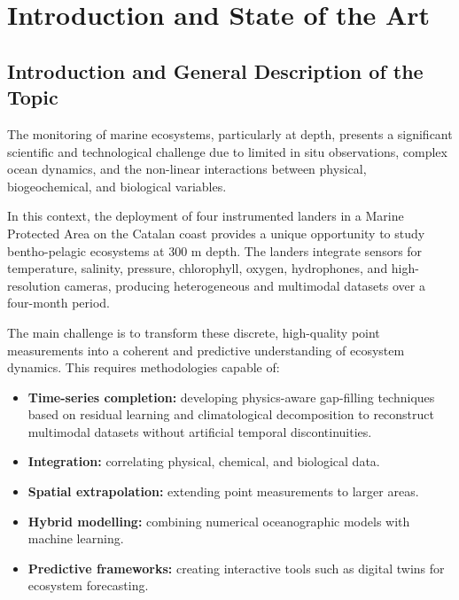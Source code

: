 \documentclass[12pt,a4paper]{article}
\begin{document}
\section{Introduction and State of the Art}\label{sec:introduction_and_state_of_the_art}

\subsection{Introduction and General Description of the Topic}
The monitoring of marine ecosystems, particularly at depth, presents a significant scientific and technological challenge due to limited in situ observations, complex ocean dynamics, and the non-linear interactions between physical, biogeochemical, and biological variables.

In this context, the deployment of four instrumented landers in a Marine Protected Area on the Catalan coast provides a unique opportunity to study bentho-pelagic ecosystems at 300 m depth. The landers integrate sensors for temperature, salinity, pressure, chlorophyll, oxygen, hydrophones, and high-resolution cameras, producing heterogeneous and multimodal datasets over a four-month period.

The main challenge is to transform these discrete, high-quality point measurements into a coherent and predictive understanding of ecosystem dynamics. This requires methodologies capable of:
\begin{itemize}[noitemsep]
    \item \textbf{Time-series completion:} developing physics-aware gap-filling techniques based on residual learning and climatological decomposition to reconstruct multimodal datasets without artificial temporal discontinuities.
    \item \textbf{Integration:} correlating physical, chemical, and biological data.
    \item \textbf{Spatial extrapolation:} extending point measurements to larger areas.
    \item \textbf{Hybrid modelling:} combining numerical oceanographic models with machine learning.
    \item \textbf{Predictive frameworks:} creating interactive tools such as digital twins for ecosystem forecasting.
\end{itemize}
\end{document}
